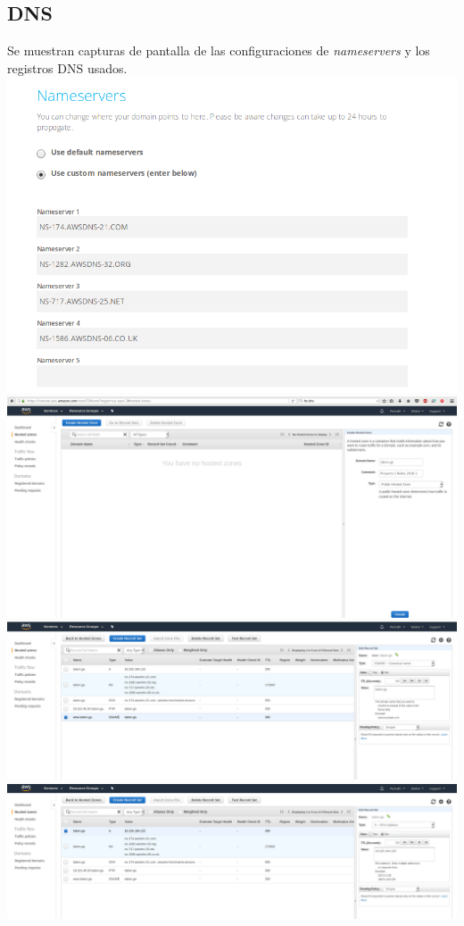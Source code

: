 \documentclass[9pt]{article}
\begin{document}
\subsection*{DNS}
Se muestran capturas de pantalla de las configuraciones de \textit{nameservers} y los registros \textsf{DNS} usados.\\
\includegraphics[width=\textwidth]{nameservers}
\includegraphics[width=\textwidth]{DNS_management}
\includegraphics[width=\textwidth]{CNAME}
\includegraphics[width=\textwidth]{A}
\end{document}
